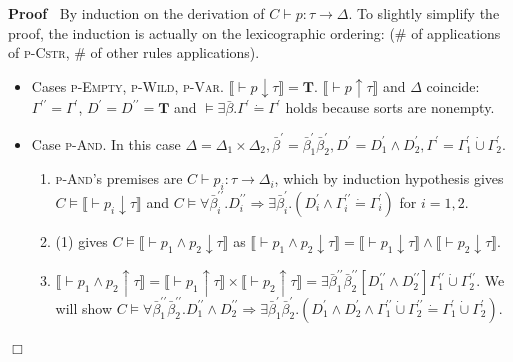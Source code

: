 \documentclass{article}
\newcommand{\nobracket}{}
\newcommand{\tmmathbf}[1]{\ensuremath{\boldsymbol{#1}}}
\newcommand{\tmname}[1]{\textsc{#1}}
\newenvironment{proof}{\noindent\textbf{Proof\ }}{\hspace*{\fill}$\Box$\medskip}
\begin{document}
\begin{proof}
  By induction on the derivation of $C \vdash p : \tau \longrightarrow
  \Delta$. To slightly simplify the proof, the induction is actually on the
  lexicographic ordering: (\# of applications of {\tmname{p-Cstr}}, \# of
  other rules applications).
  \begin{itemize}
    \item Cases {\tmname{p-Empty}}, {\tmname{p-Wild}}, {\tmname{p-Var}}.
    $\llbracket \vdash p \downarrow \tau \rrbracket =\tmmathbf{T}$.
    $\llbracket \vdash p \uparrow \tau \rrbracket$ and $\Delta$ coincide:
    $\Gamma^{\prime\prime} = \Gamma^{\prime}$, $D^{\prime} = D^{\prime\prime}
    =\tmmathbf{T}$ and $\vDash \exists \bar{\beta} . \Gamma^{\prime} \dot{=}
    \Gamma^{\prime}$ holds because sorts are nonempty.
    
    \item Case {\tmname{p-And}}. In this case $\Delta = \Delta_1 \times
    \Delta_2, \bar{\beta}^{\prime} = \bar{\beta}_1^{\prime}
    \bar{\beta}_2^{\prime}, D^{\prime} = D_1^{\prime} \wedge D_2^{\prime},
    \Gamma^{\prime} = \Gamma_1^{\prime} \dot{\cup} \Gamma_2^{\prime}$.
    \begin{enumerate}
      \item {\tmname{p-And}}'s premises are $C \vdash p_i : \tau
      \longrightarrow \Delta_i$, which by induction hypothesis gives $C \vDash
      \llbracket \vdash p_i \downarrow \tau \rrbracket$ and $C \vDash \forall
      \bar{\beta}^{\prime\prime}_i .D_i^{\prime\prime} \Rightarrow \exists
      \bar{\beta}_i^{\prime} . (D_i^{\prime} \wedge \Gamma_i^{\prime\prime}
      \dot{=} \Gamma_i^{\prime})$ for $i = 1, 2$.
      
      \item (1) gives $C \vDash \llbracket \vdash p_1 \wedge p_2 \downarrow
      \tau \rrbracket \nobracket \nobracket$ as $\llbracket \vdash p_1 \wedge
      p_2 \downarrow \tau \rrbracket = \llbracket \vdash p_1 \downarrow \tau
      \rrbracket \wedge \llbracket \vdash p_2 \downarrow \tau \rrbracket
      \nobracket \nobracket$.
      
      \item $\llbracket \vdash p_1 \wedge p_2 \uparrow \tau \rrbracket =
      \llbracket \vdash p_1 \uparrow \tau \rrbracket \times \llbracket \vdash
      p_2 \uparrow \tau \rrbracket = \exists \bar{\beta}^{\prime\prime}_1
      \bar{\beta}_2^{\prime\prime} [D_1^{\prime\prime} \wedge
      D_2^{\prime\prime}] \Gamma_1^{\prime\prime} \dot{\cup}
      \Gamma_2^{\prime\prime} \nobracket \nobracket \nobracket \nobracket
      \nobracket \nobracket$. We will show $C \vDash \forall
      \bar{\beta}_1^{\prime\prime} \bar{\beta}_2^{\prime\prime}
      .D_1^{\prime\prime} \wedge D_2^{\prime\prime} \Rightarrow \exists
      \bar{\beta}_1^{\prime} \bar{\beta}_2^{\prime} . (D_1^{\prime} \wedge
      D_2^{\prime} \wedge \Gamma_1^{\prime\prime} \dot{\cup}
      \Gamma_2^{\prime\prime} \dot{=} \Gamma_1^{\prime} \dot{\cup}
      \Gamma_2^{\prime})$.
      

\end{enumerate}
\end{itemize}
\end{proof}
\end{document}
